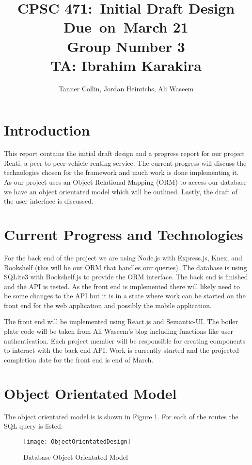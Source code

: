 \documentclass{article}
\title{
\vspace{2in}
\textmd{\textbf{CPSC 471:\ Initial Draft Design}}\\
\normalsize\vspace{0.1in}\small{Due\ on\ March 21 \\ Group Number 3 \\ TA: Ibrahim Karakira}\\
\vspace{3in}
}
\author{Tanner Collin, Jordan Heinrichs, Ali Waseem}
\date{}
\begin{document}
\maketitle
\newpage
\tableofcontents
\newpage

\section{Introduction}
This report contains the initial draft design and a progress report for our project Renti, a peer to peer vehicle renting service. The current progress will discuss the
technologies chosen for the framework and much work is done implementing it. As our project uses an Object Relational Mapping (ORM) to access our database we have an
object orientated model which will be outlined. Lastly, the draft of the user interface is discussed. %

\section{Current Progress and Technologies}
For the back end of the project we are using Node.js with Express.js, Knex, and Bookshelf (this will be our ORM that handles our queries). The database is using SQLite3 with Bookshelf.js to provide the ORM interface.
The back end is finished and the API is tested. As the front end is implemented there will likely need to be some changes to the API but it is in a state where work can be started on the front end
for the web application and possibly the mobile application.

The front end will be implemented using React.js and Semantic-UI.
The boiler plate code will be taken from Ali Waseem's blog including functions like user authentication. %
Each project member will be responsible for creating components to interact with the back end API.
Work is currently started and the projected completion date for the front end is end of March.

\section{Object Orientated Model}
The object orientated model is is shown in Figure \ref{fig:oomodel}. For each of the
routes the SQL query is listed.
\begin{figure}[ht!]
    \texttt{[image: ObjectOrientatedDesign]}
    \caption{Database Object Orientated Model}
    \centering
    \label{fig:oomodel}
\end{figure}
\end{document}
